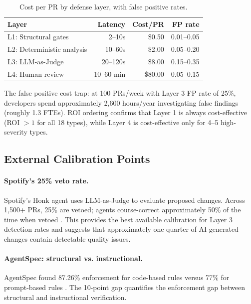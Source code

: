 \documentclass[11pt, a4paper, logo, copyright]{googledeepmind}
\begin{document}
\begin{table}[htbp]
\centering
\caption{Cost per PR by defense layer, with false positive rates.}
\label{tab:costs}
\small
\begin{tabular}{@{}l r r r@{}}
\toprule
\textbf{Layer} & \textbf{Latency} & \textbf{Cost/PR} & \textbf{FP rate} \\
\midrule
L1: Structural gates & 2--10s & \$0.50 & 0.01--0.05 \\
L2: Deterministic analysis & 10--60s & \$2.00 & 0.05--0.20 \\
L3: LLM-as-Judge & 20--120s & \$8.00 & 0.15--0.35 \\
L4: Human review & 10--60 min & \$80.00 & 0.05--0.15 \\
\bottomrule
\end{tabular}
\end{table}

The false positive cost trap: at 100 PRs/week with Layer 3 FP rate of 25\%, developers spend approximately 2,600 hours/year investigating false findings (roughly 1.3 FTEs). ROI ordering confirms that Layer 1 is always cost-effective (ROI $> 1$ for all 18 types), while Layer 4 is cost-effective only for 4--5 high-severity types.

\subsection{External Calibration Points}

\paragraph{Spotify's 25\% veto rate.} Spotify's Honk agent uses LLM-as-Judge to evaluate proposed changes. Across 1,500+ PRs, 25\% are vetoed; agents course-correct approximately 50\% of the time when vetoed \citep{spotify2025}. This provides the best available calibration for Layer 3 detection rates and suggests that approximately one quarter of AI-generated changes contain detectable quality issues.

\paragraph{AgentSpec: structural vs. instructional.} AgentSpec found 87.26\% enforcement for code-based rules versus 77\% for prompt-based rules \citep{wang2026agentspec}. The 10-point gap quantifies the enforcement gap between structural and instructional verification.
\end{document}
